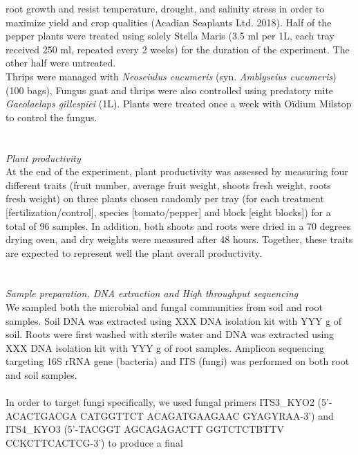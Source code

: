 \documentclass[11pt,]{article}
\begin{document}
root growth and resist temperature, drought, and salinity stress in
order to maximize yield and crop qualities (Acadian Seaplants Ltd.
2018). Half of the pepper plants were treated using solely Stella Maris
(3.5 ml per 1L, each tray received 250 ml, repeated every 2 weeks) for
the duration of the experiment. The other half were untreated. ~\\
Thrips were managed with \emph{Neoseiulus cucumeris} (syn.
\emph{Amblyseius cucumeris}) (100 bags), Fungus gnat and thrips were
also controlled using predatory mite \emph{Gaeolaelaps gillespiei} (1L).
Plants were treated once a week with Oïdium Milstop to control the
fungus.\\
\hspace*{0.333em}\\
\hspace*{0.333em}\\
\emph{Plant productivity}\\
At the end of the experiment, plant productivity was assessed by
measuring four different traits (fruit number, average fruit weight,
shoots fresh weight, roots fresh weight) on three plants chosen randomly
per tray (for each treatment {[}fertilization/control{]}, species
{[}tomato/pepper{]} and block {[}eight blocks{]}) for a total of 96
samples. In addition, both shoots and roots were dried in a 70 degrees
drying oven, and dry weights were measured after 48 hours. Together,
these traits are expected to represent well the plant overall
productivity.\\
\hspace*{0.333em}\\
\hspace*{0.333em}\\
\emph{Sample preparation, DNA extraction and High throughput
sequencing}\\
We sampled both the microbial and fungal communities from soil and root
samples. Soil DNA was extracted using XXX DNA isolation kit with YYY g
of soil. Roots were first washed with sterile water and DNA was
extracted using XXX DNA isolation kit with YYY g of root samples.
Amplicon sequencing targeting 16S rRNA gene (bacteria) and ITS (fungi)
was performed on both root and soil samples.\\
\hspace*{0.333em}\\
In order to target fungi specifically, we used fungal primers ITS3\_KYO2
(5'-ACACTGACGA CATGGTTCT ACAGATGAAGAAC GYAGYRAA-3') and ITS4\_KYO3
(5'-TACGGT AGCAGAGACTT GGTCTCTBTTV CCKCTTCACTCG-3') to produce a final
\end{document}
